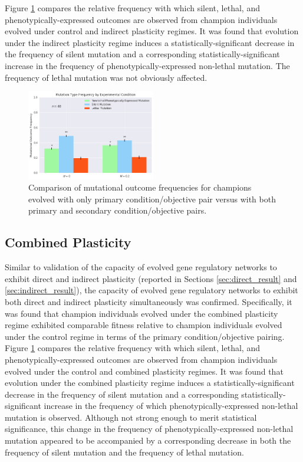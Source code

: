Figure \ref{fig:mutation_type_indirect} compares the relative frequency with which silent, lethal, and phenotypically-expressed outcomes are observed from champion individuals evolved under control and indirect plasticity regimes.
It was found that evolution under the indirect plasticity regime induces a statistically-significant decrease in the frequency of silent mutation and a corresponding statistically-significant increase in the frequency of phenotypically-expressed non-lethal mutation.
The frequency of lethal mutation was not obviously affected.

\begin{figure}
    \centering
    \includegraphics[width=0.5\textwidth]{img/mutation_type_indirect}
  	\caption{Comparison of mutational outcome frequencies for champions evolved with only primary condition/objective pair versus with both primary and secondary condition/objective pairs.}
    \label{fig:mutation_type_indirect}
\end{figure}

\subsection{Combined Plasticity} \label{sec:combined_result}
Similar to validation of the capacity of evolved gene regulatory networks to exhibit direct and indirect plasticity (reported in Sections \ref{sec:direct_result} and \ref{sec:indirect_result}), the capacity of evolved gene regulatory networks to exhibit both direct and indirect plasticity simultaneously was confirmed.
Specifically, it was found that champion individuals evolved under the combined plasticity regime exhibited comparable fitness relative to champion individuals evolved under the control regime in terms of the primary condition/objective pairing.
Figure \ref{fig:mutation_type_indirect} compares the relative frequency with which silent, lethal, and phenotypically-expressed outcomes are observed from champion individuals evolved under the control and combined plasticity regimes.
It was found that evolution under the combined plasticity regime induces a statistically-significant decrease in the frequency of silent mutation and a corresponding statistically-significant increase in the frequency of which phenotypically-expressed non-lethal mutation is observed.
Although not strong enough to merit statistical significance, this change in the frequency of phenotypically-expressed non-lethal mutation appeared to be accompanied by a corresponding decrease in both the frequency of silent mutation and the frequency of lethal mutation.

